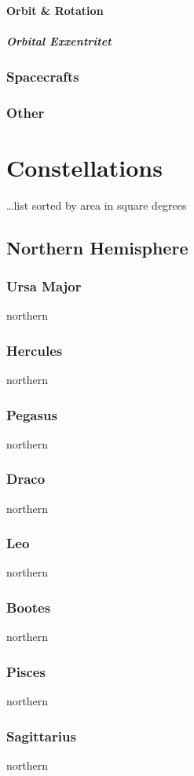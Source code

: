 \paragraph{Orbit \& Rotation}
\subparagraph{Orbital Exxentritet}
\subsubsection{Spacecrafts}
\subsubsection{Other}

\section{Constellations}
\ldots list sorted by area in square degrees
\subsection{Northern Hemisphere}
\subsubsection{Ursa Major}
northern
\subsubsection{Hercules}
northern
\subsubsection{Pegasus}
northern
\subsubsection{Draco}
northern
\subsubsection{Leo}
northern
\subsubsection{Bootes}
northern
\subsubsection{Pisces}
northern
\subsubsection{Sagittarius}
northern
